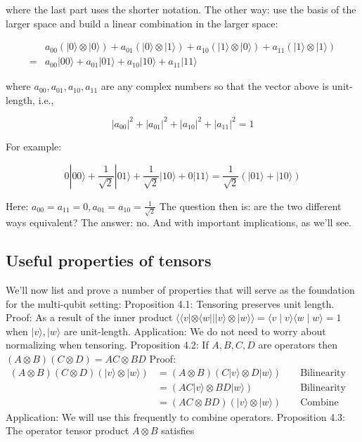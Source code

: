 \documentclass[main.tex]{subfiles}
\begin{document}
    where the last part uses the shorter notation. The other way: use the basis of the larger space and build a linear combination in the larger space: 
    
    $$
    \begin{aligned}
    & a_{00}(|0\rangle \otimes|0\rangle)+a_{01}(|0\rangle \otimes|1\rangle)+a_{10}(|1\rangle \otimes|0\rangle)+a_{11}(|1\rangle \otimes|1\rangle) \\
    =& a_{00}|00\rangle+a_{01}|01\rangle+a_{10}|10\rangle+a_{11}|11\rangle
    \end{aligned}
    $$
    
    where $a_{00}, a_{01}, a_{10}, a_{11}$ are any complex numbers so that the vector above is unit-length, i.e.,
    
    $$
    \left|a_{00}\right|^{2}+\left|a_{01}\right|^{2}+\left|a_{10}\right|^{2}+\left|a_{11}\right|^{2}=1
    $$
    
    For example:
    
    $$
    0|00\rangle+\frac{1}{\sqrt{2}}|01\rangle+\frac{1}{\sqrt{2}}|10\rangle+0|11\rangle=\frac{1}{\sqrt{2}}(|01\rangle+|10\rangle)
    $$
    
    Here: $a_{00}=a_{11}=0, a_{01}=a_{10}=\frac{1}{\sqrt{2}}$ The question then is: are the two different ways equivalent? The answer: no. And with important implications, as we'll see.

\subsection{Useful properties of tensors}

    We'll now list and prove a number of properties that will serve as the foundation for the multi-qubit setting: Proposition 4.1: Tensoring preserves unit length. Proof: As a result of the inner product $\langle\langle v|\otimes\langle w|| \mid v\rangle \otimes| w\rangle\rangle=\langle v \mid v\rangle\langle w \mid w\rangle=1$ when $|v\rangle,|w\rangle$ are unit-length. Application: We do not need to worry about normalizing when tensoring. Proposition 4.2: If $A, B, C, D$ are operators then $(A \otimes B)(C \otimes D)=A C \otimes B D$ Proof: $\begin{aligned}(A \otimes B)(C \otimes D)(|v\rangle \otimes|w\rangle) &=(A \otimes B)(C|v\rangle \otimes D|w\rangle) & & \text { Bilinearity } \\ &=(A C|v\rangle \otimes B D|w\rangle) & & \text { Bilinearity again } \\ &=(A C \otimes B D)(|v\rangle \otimes|w\rangle) & & \text { Combine operators, and factor out } \end{aligned}$ Application: We will use this frequently to combine operators. Proposition 4.3: The operator tensor product $A \otimes B$ satisfies
    
\end{document}
